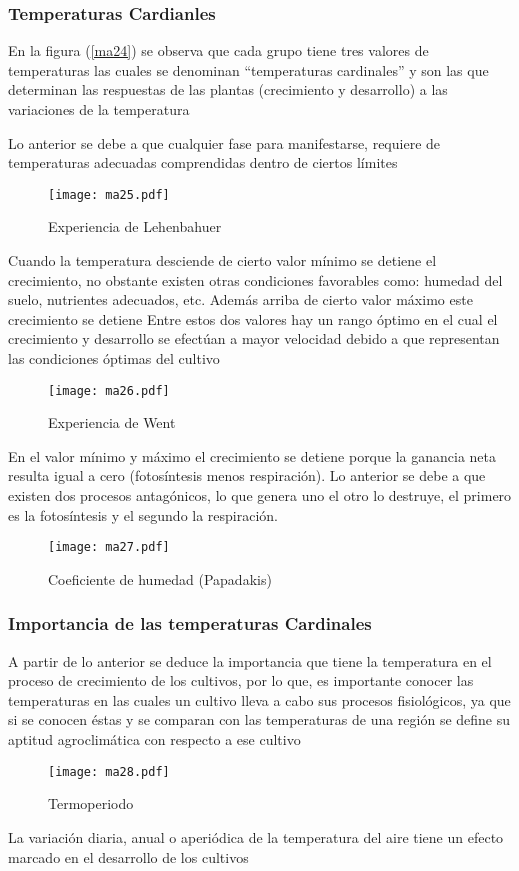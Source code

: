 \subsubsection{Temperaturas Cardianles}

En la figura (\ref{ma24}) se observa que cada grupo tiene tres valores de temperaturas las cuales se denominan “temperaturas cardinales” y son las que determinan las respuestas de las plantas (crecimiento y desarrollo) a las variaciones de la temperatura

Lo anterior se debe a que cualquier fase para manifestarse, requiere de temperaturas adecuadas comprendidas dentro de ciertos límites
\begin{figure}[h!]
\centering
  \texttt{[image: ma25.pdf]}
  \caption{Experiencia de Lehenbahuer}
  \label{ma25}
\end{figure}

Cuando la temperatura desciende de cierto valor mínimo se detiene el crecimiento, no obstante existen otras condiciones favorables como: humedad del suelo, nutrientes adecuados, etc. Además arriba de cierto valor máximo este crecimiento se detiene Entre estos dos valores hay un rango óptimo en el cual el crecimiento y desarrollo se efectúan a mayor velocidad debido a que representan las condiciones óptimas del cultivo
\begin{figure}[h!]
\centering
  \texttt{[image: ma26.pdf]}
  \caption{Experiencia de Went}
  \label{ma26}
\end{figure}
En el valor mínimo y máximo el crecimiento se detiene porque la ganancia neta resulta igual a cero (fotosíntesis menos respiración). Lo anterior se debe a que existen dos procesos antagónicos, lo que genera uno el otro lo destruye, el primero es la fotosíntesis y el segundo la respiración.
\begin{figure}[h!]
\centering
  \texttt{[image: ma27.pdf]}
  \caption{Coeficiente de humedad (Papadakis)}
  \label{ma27}
\end{figure}
\subsubsection{Importancia de las temperaturas Cardinales}

A partir de lo anterior se deduce la importancia que tiene la temperatura en el proceso de crecimiento de los cultivos, por lo que, es importante conocer las temperaturas en las cuales un cultivo lleva a cabo sus procesos fisiológicos, ya que si se conocen éstas y se comparan con las temperaturas de una región se define su aptitud agroclimática con respecto a ese cultivo
\begin{figure}[h!]
\centering
  \texttt{[image: ma28.pdf]}
  \caption{Termoperiodo}
  \label{ma28}
\end{figure}
La variación diaria, anual o aperiódica de la temperatura del aire tiene un efecto marcado en el desarrollo de los cultivos

